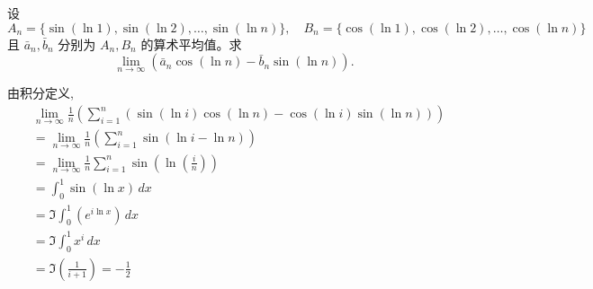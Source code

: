 \begin{questions}
    \question 设 
    \[
    A_n = \{\sin(\ln 1), \sin(\ln 2), \dots, \sin(\ln n)\}, \quad B_n = \{\cos(\ln 1), \cos(\ln 2), \dots, \cos(\ln n)\}
    \]
    且 $\bar{a}_n,\bar{b}_n$ 分别为 $A_n,B_n$ 的算术平均值。求 
    \[
    \lim_{n\to\infty} (\bar{a}_n \cos(\ln n) - \bar{b}_n \sin(\ln n)).
    \]
    \begin{solution}
        由积分定义,
        \begin{align*}
        &\lim_{n \to \infty} \frac{1}{n} \left( \sum_{i=1}^n (\sin(\ln i)\cos(\ln n) - \cos(\ln i)\sin(\ln n)) \right) \\
        &=\lim_{n\to\infty} \frac{1}{n} \left(\sum_{i=1}^{n} \sin(\ln i - \ln n)\right) \\
        &= \lim_{n\to\infty} \frac{1}{n} \sum_{i=1}^{n} \sin\left(\ln \left(\frac{i}{n}\right)\right) \\
        &= \int_0^1 \sin(\ln x) \, dx \\
        &= \Im \int_0^1 (e^{i\ln x}) \, dx \\
        &= \Im \int_0^1 x^i \, dx \\
        &= \Im \left(\frac{1}{i+1}\right) = -\frac{1}{2}
        \end{align*}
    \end{solution}


\end{questions}
